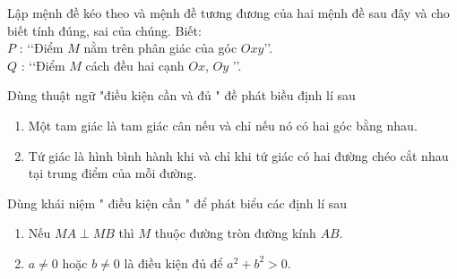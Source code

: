 \begin{bt}%
	Lập mệnh đề kéo  theo và mệnh đề tương đương của hai mệnh đề sau đây và cho biết tính đúng, sai của chúng. Biết:\\
	$P$ : \lq\lq  Điểm $M$ nằm trên phân giác của góc $Oxy$\rq\rq.\\
	$Q$ : \lq\lq  Điểm $M$ cách đều hai cạnh $Ox$, $Oy$ \rq\rq.
\end{bt}

\begin{bt}%
	Dùng thuật ngữ "điều kiện cần và đủ " đề phát biều  định lí sau
	\begin{enumerate}
		\item Một tam giác là tam giác cân nếu  và chỉ nếu nó có hai góc bằng nhau.
		\item Tứ giác là hình bình hành khi và chỉ khi tứ giác có hai đường chéo cắt nhau tại trung  điểm của mỗi đường.
	\end{enumerate}
\end{bt}

\begin{bt}%
	Dùng khái niệm " điều kiện cần "  để phát biểu các định lí sau
	\begin{enumerate}
		\item Nếu $M A \perp  M B$ thì $M$ thuộc đường tròn đường kính $A B$.
		 \item $a \neq 0$ hoặc $b \neq 0$ là điều kiện đủ để $a^{2}+b^{2}>0$.
	\end{enumerate}
\end{bt}

